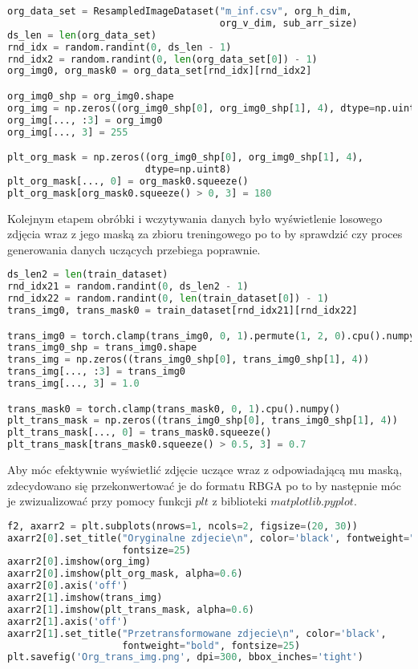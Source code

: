 \cell
\begin{lstlisting}[name=Rozdzial3.1, language=Python]
org_data_set = ResampledImageDataset("m_inf.csv", org_h_dim, 
                                     org_v_dim, sub_arr_size)
ds_len = len(org_data_set)
rnd_idx = random.randint(0, ds_len - 1)
rnd_idx2 = random.randint(0, len(org_data_set[0]) - 1)
org_img0, org_mask0 = org_data_set[rnd_idx][rnd_idx2]

org_img0_shp = org_img0.shape
org_img = np.zeros((org_img0_shp[0], org_img0_shp[1], 4), dtype=np.uint8)
org_img[..., :3] = org_img0
org_img[..., 3] = 255

plt_org_mask = np.zeros((org_img0_shp[0], org_img0_shp[1], 4), 
                        dtype=np.uint8)
plt_org_mask[..., 0] = org_mask0.squeeze()
plt_org_mask[org_mask0.squeeze() > 0, 3] = 180 
\end{lstlisting}


\cell
Kolejnym etapem obróbki i wczytywania danych było wyświetlenie losowego zdjęcia wraz z jego maską za zbioru treningowego po to by sprawdzić czy proces generowania danych uczących przebiega poprawnie.

\cell
\begin{lstlisting}[name=Rozdzial3.1, language=Python]
ds_len2 = len(train_dataset)
rnd_idx21 = random.randint(0, ds_len2 - 1)
rnd_idx22 = random.randint(0, len(train_dataset[0]) - 1)
trans_img0, trans_mask0 = train_dataset[rnd_idx21][rnd_idx22]

trans_img0 = torch.clamp(trans_img0, 0, 1).permute(1, 2, 0).cpu().numpy()
trans_img0_shp = trans_img0.shape
trans_img = np.zeros((trans_img0_shp[0], trans_img0_shp[1], 4))
trans_img[..., :3] = trans_img0
trans_img[..., 3] = 1.0

trans_mask0 = torch.clamp(trans_mask0, 0, 1).cpu().numpy()
plt_trans_mask = np.zeros((trans_img0_shp[0], trans_img0_shp[1], 4))
plt_trans_mask[..., 0] = trans_mask0.squeeze()
plt_trans_mask[trans_mask0.squeeze() > 0.5, 3] = 0.7
\end{lstlisting}


\cell
Aby móc efektywnie wyświetlić zdjęcie uczące wraz z odpowiadającą mu maską, zdecydowano się przekonwertować je do formatu RBGA po to by następnie móc je zwizualizować przy pomocy funkcji $\textit{plt}$ z biblioteki $\textit{matplotlib.pyplot}$.

\cell
\begin{lstlisting}[name=Rozdzial3.1, language=Python]
f2, axarr2 = plt.subplots(nrows=1, ncols=2, figsize=(20, 30))
axarr2[0].set_title("Oryginalne zdjecie\n", color='black', fontweight="bold",
                    fontsize=25)
axarr2[0].imshow(org_img)
axarr2[0].imshow(plt_org_mask, alpha=0.6)
axarr2[0].axis('off')
axarr2[1].imshow(trans_img)
axarr2[1].imshow(plt_trans_mask, alpha=0.6)
axarr2[1].axis('off')
axarr2[1].set_title("Przetransformowane zdjecie\n", color='black', 
                    fontweight="bold", fontsize=25)
plt.savefig('Org_trans_img.png', dpi=300, bbox_inches='tight')
\end{lstlisting}

